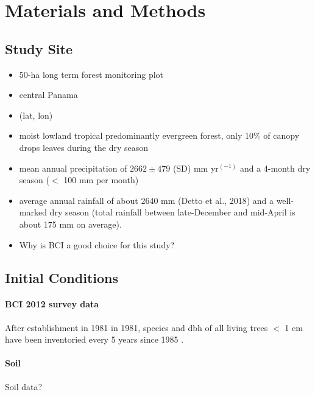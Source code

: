 \section*{Materials and Methods}

{}
\subsection*{Study Site}

\begin{itemize}
    \item 50-ha long term forest monitoring plot
    \item central Panama
    \item (lat, lon)
    \item moist lowland tropical predominantly evergreen forest, only 10\% of canopy drops leaves during the dry season %
    \item mean annual precipitation of $2662 \pm 479$ (SD) mm yr$^{(-1)}$ and a 4-month dry season ($<$ 100 mm per month)  
    \item average annual rainfall of about 2640 mm (Detto et al.,
2018) and a well-marked dry season (total rainfall between late-December and mid-April is about 175 mm on average). 
    \item Why is BCI a good choice for this study?
\end{itemize}
{}
\subsection*{Initial Conditions}

\paragraph{BCI 2012 survey data}
After establishment in 1981 in 1981, species and dbh of all living trees $<$ 1 cm have been inventoried every 5 years since 1985 \citep{condit_1995}. 

\paragraph{Soil} 
Soil data?

